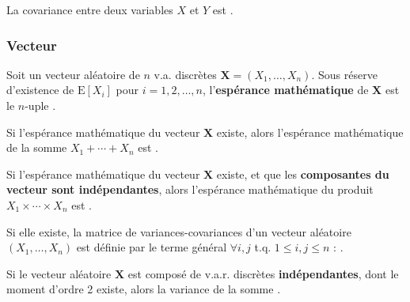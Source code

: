 \documentclass[10pt, french]{report}
\begin{document}
\begin{multicols*}{2}
\bigskip


\begin{definitionNOHFILL}[Covariance]
La covariance entre deux variables $X$ et $Y$ est .
\end{definitionNOHFILL}

\subsubsection{Vecteur}
\begin{definitionNOHFILL}
Soit un vecteur aléatoire de $n$ v.a. discrètes $\bm{X} = (X_{1}, \dots, X_{n})$. Sous réserve d'existence de $\text{E}[X_{i}]$ pour $i = 1, 2, \dots, n$, l'\textbf{espérance mathématique} de $\bm{X}$ est le $n$-uple .

\begin{definitionNOHFILLprop}
Si l'espérance mathématique du vecteur $\bm{X}$ existe, alors l'espérance mathématique de la somme $X_{1} + \cdots + X_{n}$ est .
\end{definitionNOHFILLprop}

\begin{definitionNOHFILLprop}
Si l'espérance mathématique du vecteur $\bm{X}$ existe, et que les \textbf{composantes du vecteur sont indépendantes}, alors l'espérance mathématique du produit $X_{1} \times \cdots \times X_{n}$ est .
\end{definitionNOHFILLprop}
\end{definitionNOHFILL}


\bigskip


\begin{definitionNOHFILL}
Si elle existe, la matrice de variances-covariances d'un vecteur aléatoire $(X_{1}, \dots, X_{n})$ est définie par le terme général $\forall i, j$  t.q. $1 \leq i, j \leq n$ : .

\bigskip

\begin{definitionNOHFILLprop}
Si le vecteur aléatoire $\bm{X}$ est composé de v.a.r. discrètes \textbf{indépendantes}, dont le moment d'ordre 2 existe, alors la variance de la somme .
\end{definitionNOHFILLprop}
\end{definitionNOHFILL}



\end{multicols*}
\end{document}
